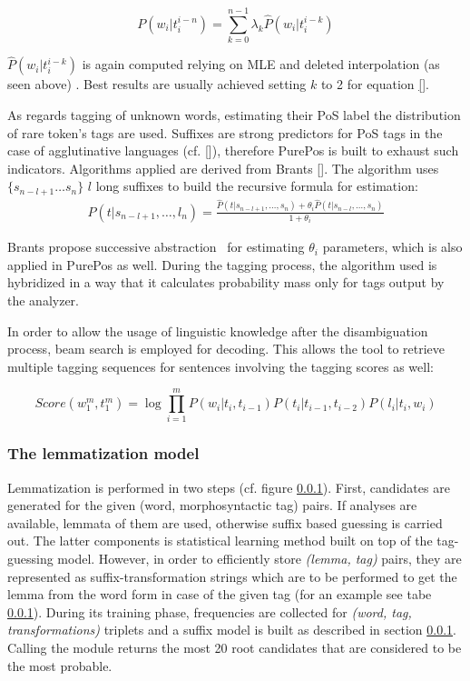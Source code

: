 \begin{equation} 
P(w_i | t_{i}^{i-n}) = \sum_{k=0}^{n-1} \lambda_k \hat{P}(w_i|t_{i}^{i-k})
\end{equation}

$\hat{P}(w_i|t_{i}^{i-k})$ is again computed relying on MLE and deleted interpolation (as seen above) . Best results are usually achieved setting $k$ to 2 for equation \eqref{}.

As regards tagging of unknown words, estimating their PoS label the distribution of rare token’s tags are used. Suffixes are strong predictors for PoS tags in the case of agglutinative languages (cf. []), therefore PurePos is built to exhaust such indicators. Algorithms applied are derived from Brants []. The algorithm uses $\{s_{n-l+1} \dots s_n\}$ $l$ long suffixes to build the recursive formula for estimation:
\begin{align}
 P(t|s_{n-l+1}, \dots, l_n) 
 = \frac{ \hat{P}(t|s_{n-l+1}, \dots, s_n) + \theta_i \hat{P}(t|s_{n-l}, \dots, s_n)}{1+\theta_i}
\end{align}

Brants propose successive abstraction~\cite{} for estimating $\theta_i$ parameters, which is also applied in PurePos as well.
During the tagging process, the algorithm used is hybridized in a way that it calculates probability mass only for tags output by the analyzer.

In order to allow the usage of linguistic knowledge after the disambiguation process, beam search is employed for decoding.
This allows the tool to retrieve multiple tagging sequences for sentences involving the tagging scores as well:

\begin{equation} %
Score(w_1^m,t_1^m) = \log \prod_{i=1}^m P(w_i|t_i,t_{i-1})P(t_i|t_{i-1},t_{i-2})P(l_i|t_i,w_i)
\end{equation}

\subsubsection{The lemmatization model}

Lemmatization is performed in two steps (cf. figure \ref{}).
First, candidates are generated for the given (word, morphosyntactic tag) pairs.
If analyses are available, lemmata of them are used, otherwise suffix based guessing is carried out.
The latter components is statistical learning method built on top of the tag-guessing model.
However, in order to efficiently store \emph{(lemma, tag)} pairs, they are represented as suffix-transformation strings which are to be performed to get the lemma from the word form in case of the given tag (for an example see tabe \ref{}).
During its training phase, frequencies are collected for \emph{(word, tag, transformations)} triplets and a suffix model is built as described in section \ref{}.
Calling the module returns the most 20 root candidates that are considered to be the most probable.

